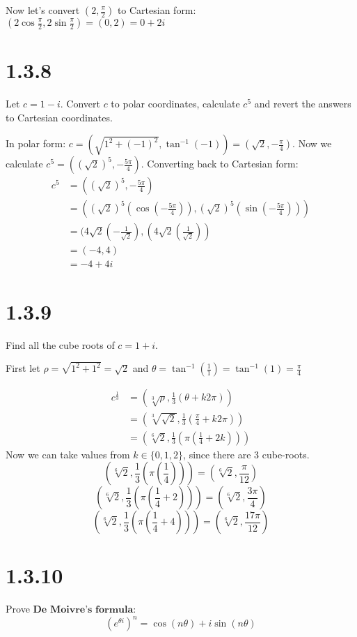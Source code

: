 \documentclass[11pt]{article}
\begin{document}
Now let's convert $(2,\frac{\pi}{2})$ to Cartesian form: $(2\cos{\frac{\pi}{2}},2\sin{\frac{\pi}{2}}) = (0,2) = 0 + 2i$

\section{1.3.8}
Let $c = 1 - i$. Convert $c$ to polar coordinates, calculate $c^5$ and revert the answers to Cartesian coordinates. 

In polar form: $c = (\sqrt{1^2 + (-1)^2},\tan^{-1}(-1)) = (\sqrt{2},-\frac{\pi}{4})$. 
Now we calculate $c^5 = ((\sqrt{2})^5, -\frac{5\pi}{4})$.
Converting back to Cartesian form: 
\begin{align*}
  c^5 &= ((\sqrt{2})^5, -\frac{5\pi}{4})  \\ 
	&= ((\sqrt{2})^5(\cos(-\frac{5\pi}{4})), (\sqrt{2})^5(\sin (-\frac{5\pi}{4})))  \\
	&= (4\sqrt{2}(-\frac{1}{\sqrt{2}}), (4\sqrt{2}(\frac{1}{\sqrt{2}}))  \\
	&= (-4, 4)  \\
	&= -4 + 4i
\end{align*}



\section{1.3.9}
Find all the cube roots of $c = 1 + i$.

First let $\rho = \sqrt{1^2 + 1^2} = \sqrt{2}$ and $\theta = \tan^{-1}(\frac{1}{1}) =\tan^{-1}(1) = \frac{\pi}{4}$

\begin{align*}
	c^{\frac{1}{3}} &= (\sqrt[3]{\rho}, \frac{1}{3}(\theta + k2\pi))  \\
			&= (\sqrt[3]{\sqrt{2}}, \frac{1}{3}(\frac{\pi}{4} + k2\pi)) \\
			&= (\sqrt[6]{2}, \frac{1}{3}(\pi(\frac{1}{4} + 2k)))
\end{align*}
Now we can take values from $k \in \{0,1,2\}$, since there are 3 cube-roots. 
$$(\sqrt[6]{2}, \frac{1}{3}(\pi(\frac{1}{4}))) = (\sqrt[6]{2}, \frac{\pi}{12})$$
$$(\sqrt[6]{2}, \frac{1}{3}(\pi(\frac{1}{4} + 2))) = (\sqrt[6]{2}, \frac{3\pi}{4})$$
$$(\sqrt[6]{2}, \frac{1}{3}(\pi(\frac{1}{4} + 4))) = (\sqrt[6]{2}, \frac{17\pi}{12})$$


\section{1.3.10}
Prove $\textbf{De Moivre's formula}$: \\
$$(e^{\theta i})^n = \cos(n\theta) + i \sin(n\theta)$$
\end{document}
